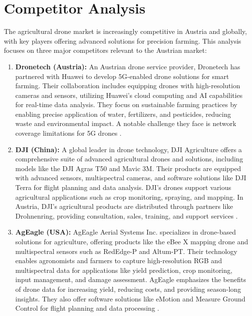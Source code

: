 
\section{Competitor Analysis}

The agricultural drone market is increasingly competitive in Austria and globally, with key players offering advanced solutions for precision farming. This analysis focuses on three major competitors relevant to the Austrian market:

\begin{enumerate} 
	\item \textbf{Dronetech (Austria):} An Austrian drone service provider, Dronetech has partnered with Huawei to develop 5G-enabled drone solutions for smart farming. Their collaboration includes equipping drones with high-resolution cameras and sensors, utilizing Huawei's cloud computing and AI capabilities for real-time data analysis. They focus on sustainable farming practices by enabling precise application of water, fertilizers, and pesticides, reducing waste and environmental impact. A notable challenge they face is network coverage limitations for 5G drones \cite{huawei_dronetech_2022, huawei_boosting_farming_2022, dronetech_smart_farming_project}.
	

	\item \textbf{DJI (China):} A global leader in drone technology, DJI Agriculture offers a comprehensive suite of advanced agricultural drones and solutions, including models like the DJI Agras T50 and Mavic 3M. Their products are equipped with advanced sensors, multispectral cameras, and software solutions like DJI Terra for flight planning and data analysis. DJI's drones support various agricultural applications such as crop monitoring, spraying, and mapping. In Austria, DJI's agricultural products are distributed through partners like Drohnenring, providing consultation, sales, training, and support services \cite{drohnenring_2024, dji_agriculture_2024}.
	
	\item \textbf{AgEagle (USA):} AgEagle Aerial Systems Inc. specializes in drone-based solutions for agriculture, offering products like the eBee X mapping drone and multispectral sensors such as RedEdge-P and Altum-PT. Their technology enables agronomists and farmers to capture high-resolution RGB and multispectral data for applications like yield prediction, crop monitoring, input management, and damage assessment. AgEagle emphasizes the benefits of drone data for increasing yield, reducing costs, and providing season-long insights. They also offer software solutions like eMotion and Measure Ground Control for flight planning and data processing \cite{ageagle_agriculture_2024}.
\end{enumerate}

